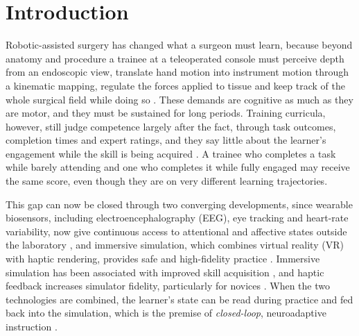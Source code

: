 \documentclass[utf8]{frontiers_suppmat}
\begin{document}
\section{Introduction}

Robotic-assisted surgery has changed what a surgeon must learn, because beyond anatomy and procedure a trainee at a teleoperated console must perceive depth from an endoscopic view, translate hand motion into instrument motion through a kinematic mapping, regulate the forces applied to tissue and keep track of the whole surgical field while doing so \cite{Haidegger2022,Riveiro-Moreno2023,Peters2018,Fujie2020,Fiorini2022}. These demands are cognitive as much as they are motor, and they must be sustained for long periods. Training curricula, however, still judge competence largely after the fact, through task outcomes, completion times and expert ratings, and they say little about the learner's engagement while the skill is being acquired \cite{Attanasio2021,Vasey2023}. A trainee who completes a task while barely attending and one who completes it while fully engaged may receive the same score, even though they are on very different learning trajectories.

This gap can now be closed through two converging developments, since wearable biosensors, including electroencephalography (EEG), eye tracking and heart-rate variability, now give continuous access to attentional and affective states outside the laboratory \cite{10.3389/fnrgo.2022.1052411,Shafiei2023,Alcaide2021Focus}, and immersive simulation, which combines virtual reality (VR) with haptic rendering, provides safe and high-fidelity practice \cite{Munawar2023,Munawar2021,Alaker2016,Rangarajan2020}. Immersive simulation has been associated with improved skill acquisition \cite{Mao2021,Gawecki2020,9262701}, and haptic feedback increases simulator fidelity, particularly for novices \cite{hapticshci2,brugada2022}. When the two technologies are combined, the learner's state can be read during practice and fed back into the simulation, which is the premise of \emph{closed-loop}, neuroadaptive instruction \cite{Guger2009Brain,long2022,qian2019}.
\end{document}
